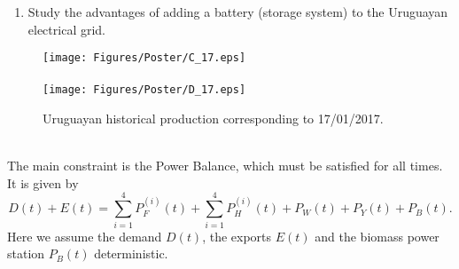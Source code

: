 \documentclass[ima, 20pt, portrait, plainboxedsections]{sciposter}
\begin{document}
\begin{multicols}{3}
\begin{enumerate}
\item[{\color{red}(2)}] Study the advantages of adding a battery (storage system) to the Uruguayan electrical grid.

\end{enumerate}

\begin{figure}[ht!]
\centering
\texttt{[image: Figures/Poster/C\_17.eps]}\\
\quad\\
\texttt{[image: Figures/Poster/D\_17.eps]}
\caption{Uruguayan historical production corresponding to 17/01/2017.}
\end{figure}\\
The main constraint is the Power Balance, which must be satisfied for all times. It is given by
\begin{equation*}
D(t)+E(t)=\sum_{i=1}^4P_F^{(i)}(t)+\sum_{i=1}^4P_H^{(i)}(t)+P_W(t)+P_Y(t)+P_B(t).
\end{equation*}
Here we assume the demand $D(t)$, the exports $E(t)$ and the biomass power station $P_B(t)$ deterministic.


\end{multicols}
\end{document}
